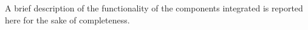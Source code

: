

A brief description of the functionality of the components integrated is reported here for the sake of completeness.

